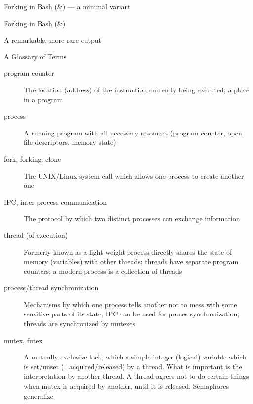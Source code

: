 \documentclass[pdflatex,colorlinks,landscape]{beamer}
\renewcommand\emph[1]{{\color{magenta}#1}}
\begin{document}
\begin{frame}{Forking in Bash (\&) --- a minimal variant}
  
\end{frame}
  
\begin{frame}[allowframebreaks]{Forking in Bash (\&)}
  \begin{tiny}
    
  \end{tiny}
\end{frame}

\begin{frame}{A remarkable, more rare output}
\end{frame}


\begin{frame}[allowframebreaks]{A Glossary of Terms}
  \begin{description}
  \item[program counter] The location (address) of the instruction currently
    being executed; a place in a program
  \item[process] A running program with all necessary resources
    (program counter, open file descriptors, memory state)
  \item[fork, forking, clone] The UNIX/Linux \emph{system call}
    which allows one process to create another one
  \item[IPC, inter-process communication] The protocol by which
    two distinct processes can exchange information
  \item[thread (of execution)] Formerly known as \emph{a light-weight process}
    directly shares the state of memory (variables) with other
    threads; threads have \emph{separate program counters};
    a modern process is a \emph{collection of threads}
  \item[process/thread synchronization] Mechanisms by which
    one process tells another not to mess with some sensitive
    parts of its state; IPC can be used for proces synchronization;
    threads are synchronized by \emph{mutexes}
  \item[mutex, futex] A mutually exclusive lock, which a simple integer
    (logical) variable which is set/unset (=acquired/released) by a
    thread. What is important is the \emph{interpretation} by another
    thread.  A thread agrees not to do certain things when mutex is
    acquired by another, until it is released. \emph{Semaphores} generalize

\end{description}
\end{frame}
\end{document}
